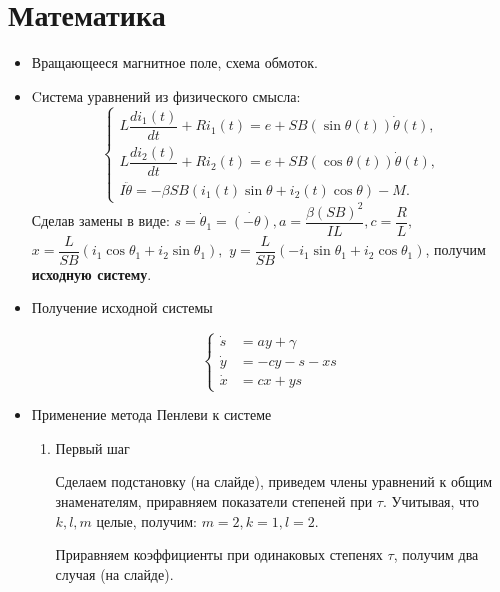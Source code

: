 \section{Математика}

\begin{itemize}

\item{Вращающееся магнитное поле, схема обмоток.}

\item{Cистема уравнений из физического смысла:}
$$
        \left\{
                \begin{aligned}
                        L \dfrac{di_1(t)}{dt} + Ri_1(t) = e + SB(\sin\theta(t)) \dot \theta (t), \\
                        L \dfrac{di_2(t)}{dt} + Ri_2(t) = e + SB(\cos\theta(t)) \dot \theta (t),
\\
  						I \ddot \theta = -\beta SB(i_1(t)\sin\theta + i_2(t)\cos\theta) - M.
                \end{aligned}
        \right.
$$
Сделав замены в виде:
$ s = \dot \theta_1 = \dot{(-\theta)}, a = \dfrac{\beta(SB)^2}{IL}, c = \dfrac{R}{L}, $
$ x = \dfrac{L}{SB} (i_1\cos\theta_1 + i_2\sin\theta_1),$
$ y = \dfrac{L}{SB} (-i_1\sin\theta_1 + i_2\cos\theta_1) $, получим \textbf{исходную систему}.

\item{Получение исходной системы}


$$
        \left\{
                \begin{aligned}
                        \dot s &= ay + \gamma \\
                        \dot y &= -cy -s -xs \\
                        \dot x &= cx + ys
                \end{aligned}
        \right. 
$$

\item{Применение метода Пенлеви к системе}

  \begin{enumerate}
    
    \item{Первый шаг}

      Сделаем подстановку (на слайде), приведем члены уравнений к общим знаменателям, приравняем показатели степеней при $ \tau $.
      Учитывая, что $ k, l, m $ целые, получим: $ m = 2, k = 1, l = 2 $.

      Приравняем коэффициенты при одинаковых степенях $ \tau $, получим два случая (на слайде).


\end{enumerate}
\end{itemize}

